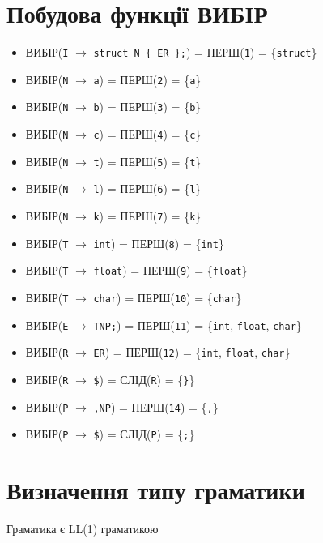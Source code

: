 \section{Побудова функції ВИБІР}
\begin{itemize}
    \item[]  ВИБІР(\verb|I| $\to$ \verb|struct N { ER };|) = ПЕРШ(\verb|1|)  = \{\verb|struct|\}
    \item[]  ВИБІР(\verb|N| $\to$ \verb|a|)                = ПЕРШ(\verb|2|)  = \{\verb|a|\}
    \item[]  ВИБІР(\verb|N| $\to$ \verb|b|)                = ПЕРШ(\verb|3|)  = \{\verb|b|\}
    \item[]  ВИБІР(\verb|N| $\to$ \verb|c|)                = ПЕРШ(\verb|4|)  = \{\verb|c|\}
    \item[]  ВИБІР(\verb|N| $\to$ \verb|t|)                = ПЕРШ(\verb|5|)  = \{\verb|t|\}
    \item[]  ВИБІР(\verb|N| $\to$ \verb|l|)                = ПЕРШ(\verb|6|)  = \{\verb|l|\}
    \item[]  ВИБІР(\verb|N| $\to$ \verb|k|)                = ПЕРШ(\verb|7|)  = \{\verb|k|\}
    \item[]  ВИБІР(\verb|T| $\to$ \verb|int|)              = ПЕРШ(\verb|8|)  = \{\verb|int|\}
    \item[]  ВИБІР(\verb|T| $\to$ \verb|float|)            = ПЕРШ(\verb|9|)  = \{\verb|float|\}
    \item[]  ВИБІР(\verb|T| $\to$ \verb|char|)             = ПЕРШ(\verb|10|) = \{\verb|char|\}
    \item[]  ВИБІР(\verb|E| $\to$ \verb|TNP;|)             = ПЕРШ(\verb|11|) = \{\verb|int|, \verb|float|, \verb|char|\}
    \item[]  ВИБІР(\verb|R| $\to$ \verb|ER|)               = ПЕРШ(\verb|12|) = \{\verb|int|, \verb|float|, \verb|char|\}
    \item[]  ВИБІР(\verb|R| $\to$ \verb|$|)                = СЛІД(\verb|R|)  = \{\verb|}|\}
    \item[]  ВИБІР(\verb|P| $\to$ \verb|,NP|)              = ПЕРШ(\verb|14|) = \{\verb|,|\}
    \item[]  ВИБІР(\verb|P| $\to$ \verb|$|)                = СЛІД(\verb|P|)  = \{\verb|;|\}
\end{itemize}


\section{Визначення типу граматики}
Граматика є LL(1) граматикою



